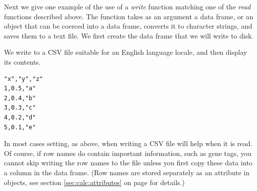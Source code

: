\documentclass[krantz2]{krantz}\usepackage{knitr}
\begin{document}
Next we give one example of the use of a \emph{write} function matching one of the \emph{read} functions described above. The  function takes as an argument a data frame, or an object that can be coerced into a data frame, converts it to character strings, and saves them to a text file. We first create the data frame that we will write to disk.

\begin{knitrout}\footnotesize
{}\color{fgcolor}\begin{kframe}
\begin{alltt}
 \hlkwb{<-} \hlstd{(} \hlstd{=} \hlopt{:}\hlstd{,}  \hlstd{=} \hlopt{:} \hlopt{/} \hlstd{,}  \hlstd{= letters[}\hlopt{:}\hlstd{])}
\end{alltt}
\end{kframe}
\end{knitrout}

We write  to a CSV file suitable for an English language locale, and then display its contents.

\begin{knitrout}\footnotesize
{}\color{fgcolor}\begin{kframe}
\begin{alltt}
  \hlstd{=} \hlstd{,}  \hlstd{=} \hlstd{)}
\hlstd{(}\hlstd{,}  \hlstd{=} \hlstd{)}
\end{alltt}
\end{kframe}
\end{knitrout}

\begin{knitrout}\footnotesize
{}\color{fgcolor}\begin{kframe}
\begin{verbatim}
"x","y","z"
1,0.5,"a"
2,0.4,"b"
3,0.3,"c"
4,0.2,"d"
5,0.1,"e"
\end{verbatim}
\end{kframe}
\end{knitrout}

\begin{explainbox}
In most cases setting, as above,  when writing a CSV file will help when it is read. Of course, if row names do contain important information, such as gene tags, you cannot skip writing the row names to the file unless you first copy these data into a column in the data frame. (Row names are stored separately as an attribute in  objects, see section \ref{sec:calc:attributes} on page \pageref{sec:calc:attributes} for details.)
\end{explainbox}
\end{document}
